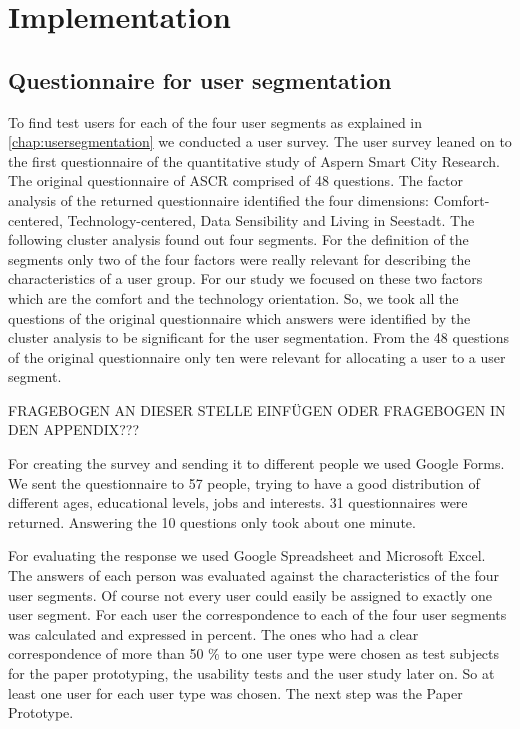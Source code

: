 \chapter{Implementation}

\section{Questionnaire for user segmentation}

To find test users for each of the four user segments as explained in \ref{chap:usersegmentation} we conducted a user survey. The user survey leaned on to the first questionnaire of the quantitative study of Aspern Smart City Research. The original questionnaire of ASCR comprised of 48 questions. The factor analysis of the returned questionnaire identified the four dimensions: Comfort-centered, Technology-centered, Data Sensibility and Living in Seestadt. The following cluster analysis found out four segments. For the definition of the segments only two of the four factors were really relevant for describing the characteristics of a user group. For our study we focused on these two factors which are the comfort and the technology orientation. So, we took all the questions of the original questionnaire which answers were identified by the cluster analysis to be significant for the user segmentation. From the 48 questions of the original questionnaire only ten were relevant for allocating a user to a user segment.

FRAGEBOGEN AN DIESER STELLE EINFÜGEN ODER FRAGEBOGEN IN DEN APPENDIX???


For creating the survey and sending it to different people we used Google Forms. We sent the questionnaire to 57 people, trying to have a good distribution of different ages, educational levels, jobs and interests. 31 questionnaires were returned. Answering the 10 questions only took about one minute.

For evaluating the response we used Google Spreadsheet and Microsoft Excel. The answers of each person was evaluated against the characteristics of the four user segments. Of course not every user could easily be assigned to exactly one user segment. For each user the correspondence to each of the four user segments was calculated and expressed in percent. The ones who had a clear correspondence of more than 50 \% to one user type were chosen as test subjects for the paper prototyping, the usability tests and the user study later on. So at least one user for each user type was chosen. The next step was the Paper Prototype.


